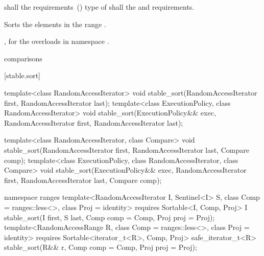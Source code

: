 \begin{itemdescr}
\pnum
\requires
{}
 shall  the
 requirements~() type of  shall  the
 and
 requirements.

\pnum
\effects
Sorts the elements in the range
.

\begin{addedblock}
\pnum
\returns {}, for the overloads in namespace .
\end{addedblock}

\pnum
\complexity
{} 
comparisons
\end{itemdescr}


[stable.sort]{}

%
\begin{itemdecl}
template<class RandomAccessIterator>
  void stable_sort(RandomAccessIterator first, RandomAccessIterator last);
template<class ExecutionPolicy, class RandomAccessIterator>
  void stable_sort(ExecutionPolicy&& exec,
                   RandomAccessIterator first, RandomAccessIterator last);

template<class RandomAccessIterator, class Compare>
  void stable_sort(RandomAccessIterator first, RandomAccessIterator last,
                   Compare comp);
template<class ExecutionPolicy, class RandomAccessIterator, class Compare>
  void stable_sort(ExecutionPolicy&& exec,
                   RandomAccessIterator first, RandomAccessIterator last,
                   Compare comp);
\end{itemdecl}
\begin{addedblock}
\begin{itemdecl}
namespace ranges {
  template<RandomAccessIterator I, Sentinel<I> S, class Comp = ranges::less<>,
      class Proj = identity>
    requires Sortable<I, Comp, Proj>
    I stable_sort(I first, S last, Comp comp = Comp{}, Proj proj = Proj{});
  template<RandomAccessRange R, class Comp = ranges::less<>, class Proj = identity>
    requires Sortable<iterator_t<R>, Comp, Proj>
    safe_iterator_t<R>
      stable_sort(R&& r, Comp comp = Comp{}, Proj proj = Proj{});
}
\end{itemdecl}
\end{addedblock}

